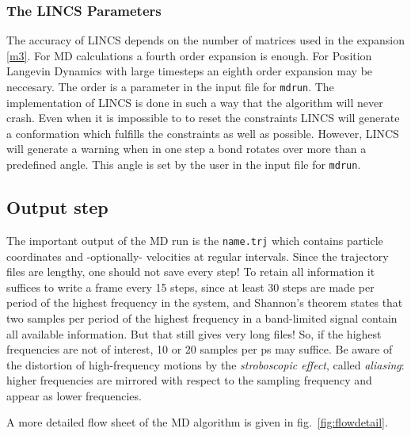 \subsubsection*{The LINCS Parameters}
The accuracy of LINCS depends on the number of matrices used
in the expansion \ref{m3}. For MD calculations a fourth order
expansion is enough. For Position Langevin Dynamics with
large timesteps an eighth order expansion may be neccesary.
The order is a parameter in the input file for \verb'mdrun'.
The implementation of LINCS is done in such a way that the 
algorithm will never crash. Even when it is impossible to
to reset the constraints LINCS will generate a conformation
which fulfills the constraints as well as possible.
However, LINCS will generate a warning when in one step a bond 
rotates over more than a predefined angle.
This angle is set by the user in the input file for \verb'mdrun'.


\subsection{Output step}
The important output of the MD run is the {\em
{}} \verb'name.trj' which contains particle coordinates
and -optionally- velocities at regular intervals. Since the trajectory
files are lengthy, one should not save every step! To retain all
information it suffices to write a frame every 15 steps, since at
least 30 steps are made per period of the highest frequency in the
system, and Shannon's  theorem states that two samples per
period of the highest frequency in a band-limited signal contain all
available information. But that still gives very long files! So, if
the highest frequencies are not of interest, 10 or 20 samples per ps
may suffice. Be aware of the distortion of high-frequency motions by
the {\em stroboscopic effect}, called {\em aliasing}: higher frequencies
are  mirrored with respect to the sampling frequency and appear as
lower frequencies. 

A more detailed flow sheet of the MD algorithm is given in
fig.~\ref{fig:flowdetail}. 

